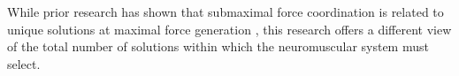 
While prior research has shown that submaximal force coordination is related to unique solutions at maximal force generation \cite{Valero-Cuevas2000Scaling}, this research offers a different view of the total number of solutions within which the neuromuscular system must select.





